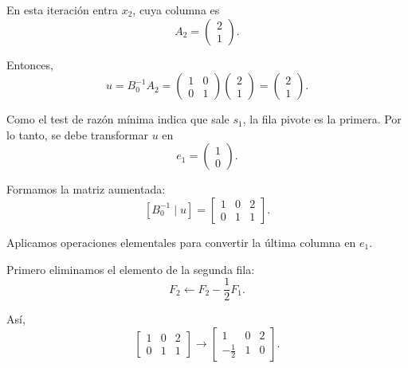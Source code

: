 \begin{enumerate}
En esta iteración entra $x_2$, cuya columna es
\begin{equation}
A_2=
\begin{pmatrix}
2\\
1
\end{pmatrix}.
\end{equation}

Entonces,
\begin{equation}
u=B_0^{-1}A_2
=
\begin{pmatrix}
1 & 0\\
0 & 1
\end{pmatrix}
\begin{pmatrix}
2\\
1
\end{pmatrix}
=
\begin{pmatrix}
2\\
1
\end{pmatrix}.
\end{equation}

Como el test de razón mínima indica que sale $s_1$, la fila pivote es la
primera. Por lo tanto, se debe transformar $u$ en
\begin{equation}
e_1=
\begin{pmatrix}
1\\
0
\end{pmatrix}.
\end{equation}

Formamos la matriz aumentada:
\begin{equation}
\left[
B_0^{-1}\mid u
\right]
=
\left[
\begin{array}{cc|c}
1 & 0 & 2\\
0 & 1 & 1
\end{array}
\right].
\end{equation}

Aplicamos operaciones elementales para convertir la última columna en $e_1$.

Primero eliminamos el elemento de la segunda fila:
\begin{equation}
F_2 \leftarrow F_2-\frac{1}{2}F_1.
\end{equation}

Así,
\begin{equation}
\left[
\begin{array}{cc|c}
1 & 0 & 2\\
0 & 1 & 1
\end{array}
\right]
\longrightarrow
\left[
\begin{array}{cc|c}
1 & 0 & 2\\
-\frac{1}{2} & 1 & 0
\end{array}
\right].
\end{equation}


\end{enumerate}

